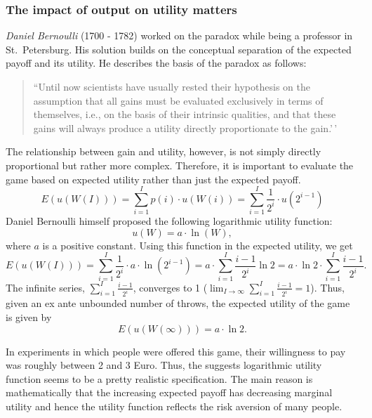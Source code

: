 \documentclass[
  12pt,
  oneside]{book}
\theoremstyle{definition}
\theoremstyle{definition}
\theoremstyle{definition}
\theoremstyle{definition}
\theoremstyle{remark}
\begin{document}
\hypertarget{the-impact-of-output-on-utility-matters}{%
\subsubsection{The impact of output on utility matters}\label{the-impact-of-output-on-utility-matters}}

\emph{Daniel Bernoulli} (1700 - 1782) worked on the paradox while being a professor in St.~Petersburg. His solution builds on the conceptual separation of the expected payoff and its utility. He describes the basis of the paradox as follows:

\begin{quote}
``Until now scientists have usually rested their hypothesis on the assumption that all gains must be evaluated exclusively in terms of themselves, i.e., on the basis of their intrinsic qualities, and that these gains will always produce a utility directly proportionate to the gain.'\,' \citep[p.~27]{Bernoulli1954Exposition}
\end{quote}

The relationship between gain and utility, however, is not simply directly proportional but rather more complex. Therefore, it is important to evaluate the game based on expected utility rather than just the expected payoff.
\[
E(u(W(I)))=\sum_{i=1}^{I} p(i) \cdot u(W(i))=\sum_{i=1}^{I} \frac{1}{2^{i}} \cdot u\left(2^{i-1}\right)
\]
Daniel Bernoulli himself proposed the following logarithmic utility function:
\[
u(W)=a \cdot \ln (W),
\]
where \(a\) is a positive constant. Using this function in the expected utility, we get
\[
E(u(W(I)))=\sum_{i=1}^{I} \frac{1}{2^{i}} \cdot a \cdot \ln \left(2^{i-1}\right)=a \cdot \sum_{i=1}^{I} \frac{i-1}{2^{i}} \ln 2=a \cdot \ln 2 \cdot \sum_{i=1}^{I} \frac{i-1}{2^{i}}.
\]
The infinite series, \(\sum_{i=1}^{I} \frac{i-1}{2^{i}}\), converges to 1 (\(\lim _{I \rightarrow \infty} \sum_{i=1}^{I} \frac{i-1}{2^{i}}=1\)). Thus, given an ex ante unbounded number of throws, the expected utility of the game is given by
\[
E(u(W(\infty)))=a \cdot \ln 2 .
\]

In experiments in which people were offered this game, their willingness to pay was roughly between 2 and 3 Euro. Thus, the suggests logarithmic utility function seems to be a pretty realistic specification.
The main reason is mathematically that the increasing expected payoff has decreasing marginal utility and hence the utility function reflects the risk aversion of many people.
\end{document}
